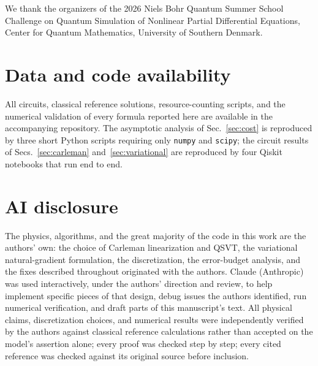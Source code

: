 \documentclass[aps,prx,twocolumn,notitlepage,superscriptaddress,floatfix,10pt]{revtex4-2}
\begin{document}
\begin{acknowledgments}
We thank the organizers of the 2026 Niels Bohr Quantum Summer School Challenge on Quantum Simulation
of Nonlinear Partial Differential Equations, Center for Quantum Mathematics, University of Southern
Denmark.
\end{acknowledgments}

\section*{Data and code availability}
All circuits, classical reference solutions, resource-counting scripts, and the numerical validation
of every formula reported here are available in the accompanying repository. The asymptotic analysis
of Sec.~\ref{sec:cost} is reproduced by three short Python scripts requiring only \texttt{numpy} and
\texttt{scipy}; the circuit results of Secs.~\ref{sec:carleman} and~\ref{sec:variational} are
reproduced by four Qiskit notebooks that run end to end.

\section*{AI disclosure}
The physics, algorithms, and the great majority of the code in this work are the authors' own: the
choice of Carleman linearization and QSVT, the variational natural-gradient formulation, the
discretization, the error-budget analysis, and the fixes described throughout originated with the
authors. Claude (Anthropic) was used interactively, under the authors' direction and review, to help
implement specific pieces of that design, debug issues the authors identified, run numerical
verification, and draft parts of this manuscript's text. All physical claims, discretization choices,
and numerical results were independently verified by the authors against classical reference
calculations rather than accepted on the model's assertion alone; every proof was checked step by
step; every cited reference was checked against its original source before inclusion.
\end{document}
